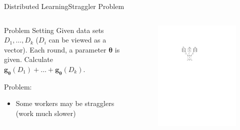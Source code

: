 \documentclass{beamer}
\begin{document}
\begin{frame}{Distributed Learning}{Straggler Problem}
    \begin{columns}
        \begin{column}{0.6\textwidth}
            \begin{block}{Problem Setting}
                Given data sets $D_1, \dots, D_k$ ($D_i$ can be viewed as a vector). Each round, a parameter $\boldsymbol{\theta}$ is given. Calculate $\boldsymbol{g}_{\boldsymbol{\theta}}(D_1) + \dots + \boldsymbol{g}_{\boldsymbol{\theta}}(D_k)$.
            \end{block}
            Problem:
            \begin{itemize}
                \item Some workers may be stragglers (work much slower)
            \end{itemize}
            
        \end{column}
        \begin{column}{0.48\textwidth}
            \begin{figure}
                \centering
                \includegraphics[height=.5\textheight]{res/distributed_learning.pdf}
            \end{figure}
        \end{column}
    \end{columns}
\end{frame}
\end{document}
